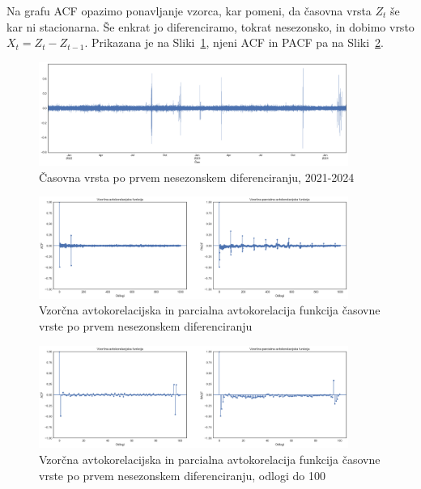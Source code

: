 \documentclass[a4paper, 11pt]{article}
\begin{document}
\noindent Na grafu ACF opazimo ponavljanje vzorca, kar pomeni, da časovna vrsta $Z_t$ še kar ni stacionarna. 
Še enkrat jo diferenciramo, tokrat nesezonsko, in dobimo vrsto $X_t = Z_t - Z_{t-1}$. 
Prikazana je na Sliki~\ref{fig:ts_diff_2}, njeni ACF in PACF pa na Sliki~\ref{fig:ts_diff_2_acf_pacf}.

\begin{figure}[h!]
    \centering
    \caption{Časovna vrsta po prvem nesezonskem diferenciranju, 2021-2024}\par\medskip
    \label{fig:ts_diff_2}
    \includegraphics[width=0.9\textwidth]{ts_diff_2.png}
\end{figure}

\begin{figure}[h!]
    \centering
    \caption{Vzorčna avtokorelacijska in parcialna avtokorelacija funkcija časovne vrste po prvem nesezonskem diferenciranju}\par\medskip
    \label{fig:ts_diff_2_acf_pacf}
    \includegraphics[width=0.9\textwidth]{ts_diff_2_acf_pacf.png}
\end{figure}

\begin{figure}[h!]
    \caption{Vzorčna avtokorelacijska in parcialna avtokorelacija funkcija časovne vrste po prvem nesezonskem diferenciranju, odlogi do 100}\par\medskip
    \centering
    \label{fig:ts_diff_2_acf_pacf_do_100}
    \includegraphics[width=0.9\textwidth]{ts_diff_2_acf_pacf_do_100.png}
\end{figure}
\end{document}
